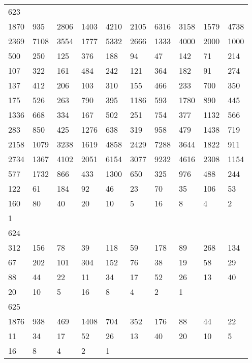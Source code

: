 \begin{longtable}{*{10}{l}}
623&&&&&&&&&\\
1870& 935& 2806& 1403& 4210& 2105& 6316& 3158& 1579& 4738\\
2369& 7108& 3554& 1777& 5332& 2666& 1333& 4000& 2000& 1000\\
500& 250& 125& 376& 188& 94& 47& 142& 71& 214\\
107& 322& 161& 484& 242& 121& 364& 182& 91& 274\\
137& 412& 206& 103& 310& 155& 466& 233& 700& 350\\
175& 526& 263& 790& 395& 1186& 593& 1780& 890& 445\\
1336& 668& 334& 167& 502& 251& 754& 377& 1132& 566\\
283& 850& 425& 1276& 638& 319& 958& 479& 1438& 719\\
2158& 1079& 3238& 1619& 4858& 2429& 7288& 3644& 1822& 911\\
2734& 1367& 4102& 2051& 6154& 3077& 9232& 4616& 2308& 1154\\
577& 1732& 866& 433& 1300& 650& 325& 976& 488& 244\\
122& 61& 184& 92& 46& 23& 70& 35& 106& 53\\
160& 80& 40& 20& 10& 5& 16& 8& 4& 2\\
1& \\

624&&&&&&&&&\\
312& 156& 78& 39& 118& 59& 178& 89& 268& 134\\
67& 202& 101& 304& 152& 76& 38& 19& 58& 29\\
88& 44& 22& 11& 34& 17& 52& 26& 13& 40\\
20& 10& 5& 16& 8& 4& 2& 1& \\

625&&&&&&&&&\\
1876& 938& 469& 1408& 704& 352& 176& 88& 44& 22\\
11& 34& 17& 52& 26& 13& 40& 20& 10& 5\\
16& 8& 4& 2& 1& \\


\end{longtable}
